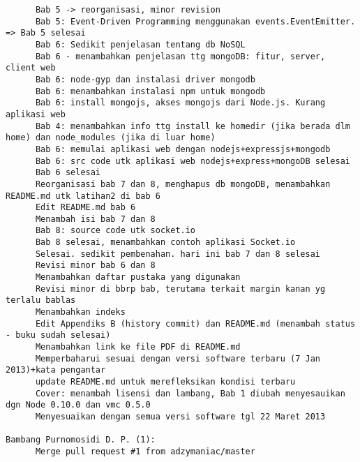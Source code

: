 \begin{lstlisting}
      Bab 5 -> reorganisasi, minor revision
      Bab 5: Event-Driven Programming menggunakan events.EventEmitter. => Bab 5 selesai
      Bab 6: Sedikit penjelasan tentang db NoSQL
      Bab 6 - menambahkan penjelasan ttg mongoDB: fitur, server, client web
      Bab 6: node-gyp dan instalasi driver mongodb
      Bab 6: menambahkan instalasi npm untuk mongodb
      Bab 6: install mongojs, akses mongojs dari Node.js. Kurang aplikasi web
      Bab 4: menambahkan info ttg install ke homedir (jika berada dlm home) dan node_modules (jika di luar home)
      Bab 6: memulai aplikasi web dengan nodejs+expressjs+mongodb
      Bab 6: src code utk aplikasi web nodejs+express+mongoDB selesai
      Bab 6 selesai
      Reorganisasi bab 7 dan 8, menghapus db mongoDB, menambahkan README.md utk latihan2 di bab 6
      Edit README.md bab 6
      Menambah isi bab 7 dan 8
      Bab 8: source code utk socket.io
      Bab 8 selesai, menambahkan contoh aplikasi Socket.io
      Selesai. sedikit pembenahan. hari ini bab 7 dan 8 selesai
      Revisi minor bab 6 dan 8
      Menambahkan daftar pustaka yang digunakan
      Revisi minor di bbrp bab, terutama terkait margin kanan yg terlalu bablas
      Menambahkan indeks
      Edit Appendiks B (history commit) dan README.md (menambah status - buku sudah selesai)
      Menambahkan link ke file PDF di README.md
      Memperbaharui sesuai dengan versi software terbaru (7 Jan 2013)+kata pengantar
      update README.md untuk merefleksikan kondisi terbaru
      Cover: menambah lisensi dan lambang, Bab 1 diubah menyesauikan dgn Node 0.10.0 dan vmc 0.5.0
      Menyesuaikan dengan semua versi software tgl 22 Maret 2013

Bambang Purnomosidi D. P. (1):
      Merge pull request #1 from adzymaniac/master
\end{lstlisting}

